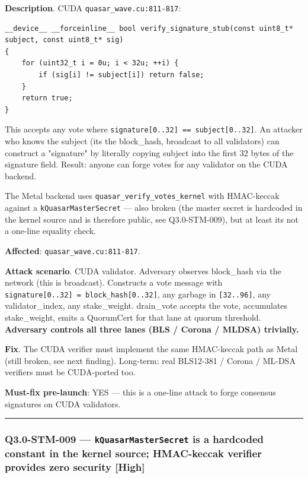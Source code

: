 \documentclass[
]{article}
\begin{document}
\textbf{Description}. CUDA \texttt{quasar\_wave.cu:811-817}:

\begin{verbatim}
__device__ __forceinline__ bool verify_signature_stub(const uint8_t* subject, const uint8_t* sig)
{
    for (uint32_t i = 0u; i < 32u; ++i) {
        if (sig[i] != subject[i]) return false;
    }
    return true;
}
\end{verbatim}

This accepts any vote where
\texttt{signature{[}0..32{]}\ ==\ subject{[}0..32{]}}. An attacker who
knows the subject (it\textquotesingle s the block\_hash, broadcast to
all validators) can construct a "signature" by literally copying subject
into the first 32 bytes of the signature field. Result: anyone can forge
votes for any validator on the CUDA backend.

The Metal backend uses \texttt{quasar\_verify\_votes\_kernel} with
HMAC-keccak against a \texttt{kQuasarMasterSecret} --- also broken (the
master secret is hardcoded in the kernel source and is therefore public,
see Q3.0-STM-009), but at least it\textquotesingle s not a one-line
equality check.

\textbf{Affected}: \texttt{quasar\_wave.cu:811-817}.

\textbf{Attack scenario}. CUDA validator. Adversary observes block\_hash
via the network (this is broadcast). Constructs a vote message with
\texttt{signature{[}0..32{]}\ =\ block\_hash{[}0..32{]}}, any garbage in
\texttt{{[}32..96{]}}, any validator\_index, any stake\_weight.
drain\_vote accepts the vote, accumulates stake\_weight, emits a
QuorumCert for that lane at quorum threshold. \textbf{Adversary controls
all three lanes (BLS / Corona / MLDSA) trivially.}

\textbf{Fix}. The CUDA verifier must implement the same HMAC-keccak path
as Metal (still broken, see next finding). Long-term: real BLS12-381 /
Corona / ML-DSA verifiers must be CUDA-ported too.

\textbf{Must-fix pre-launch}: YES --- this is a one-line attack to forge
consensus signatures on CUDA validators.

\begin{center}\rule{0.5\linewidth}{0.5pt}\end{center}

\subsubsection{\texorpdfstring{Q3.0-STM-009 ---
\texttt{kQuasarMasterSecret} is a hardcoded constant in the kernel
source; HMAC-keccak verifier provides zero security
{[}High{]}}{Q3.0-STM-009 --- kQuasarMasterSecret is a hardcoded constant in the kernel source; HMAC-keccak verifier provides zero security {[}High{]}}}\label{q30-stm-009--kquasarmastersecret-is-a-hardcoded-constant-in-the-kernel-source-hmac-keccak-verifier-provides-zero-security-high}
\end{document}
